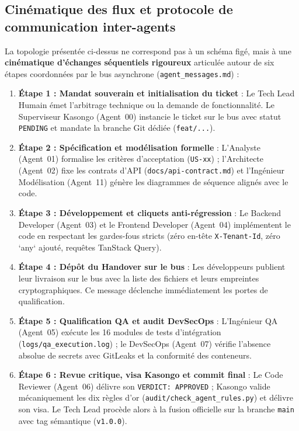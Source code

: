 \subsection{Cinématique des flux et protocole de communication inter-agents}

La topologie présentée ci-dessus ne correspond pas à un schéma figé, mais à une \textbf{cinématique d'échanges séquentiels rigoureux} articulée autour de six étapes coordonnées par le bus asynchrone (\texttt{agent\_messages.md}) :

\begin{enumerate}
  \item \textbf{Étape 1 : Mandat souverain et initialisation du ticket} :
  Le Tech Lead Humain émet l'arbitrage technique ou la demande de fonctionnalité. Le Superviseur Kasongo (Agent~00) instancie le ticket sur le bus avec statut \texttt{PENDING} et mandate la branche Git dédiée (\texttt{feat/...}).
  
  \item \textbf{Étape 2 : Spécification et modélisation formelle} :
  L'Analyste (Agent~01) formalise les critères d'acceptation (\texttt{US-xx}) ; l'Architecte (Agent~02) fixe les contrats d'API (\nolinkurl{docs/api-contract.md}) et l'Ingénieur Modélisation (Agent~11) génère les diagrammes de séquence alignés avec le code.
  
  \item \textbf{Étape 3 : Développement et cliquets anti-régression} :
  Le Backend Developer (Agent~03) et le Frontend Developer (Agent~04) implémentent le code en respectant les gardes-fous stricts (zéro en-tête \texttt{X-Tenant-Id}, zéro `any` ajouté, requêtes TanStack Query).
  
  \item \textbf{Étape 4 : Dépôt du Handover sur le bus} :
  Les développeurs publient leur livraison sur le bus avec la liste des fichiers et leurs empreintes cryptographiques. Ce message déclenche immédiatement les portes de qualification.
  
  \item \textbf{Étape 5 : Qualification QA et audit DevSecOps} :
  L'Ingénieur QA (Agent~05) exécute les 16 modules de tests d'intégration (\nolinkurl{logs/qa_execution.log}) ; le DevSecOps (Agent~07) vérifie l'absence absolue de secrets avec GitLeaks et la conformité des conteneurs.
  
  \item \textbf{Étape 6 : Revue critique, visa Kasongo et commit final} :
  Le Code Reviewer (Agent~06) délivre son \texttt{VERDICT: APPROVED} ; Kasongo valide mécaniquement les dix règles d'or (\texttt{audit/check\_agent\_rules.py}) et délivre son visa. Le Tech Lead procède alors à la fusion officielle sur la branche \texttt{main} avec tag sémantique (\texttt{v1.0.0}).
\end{enumerate}

